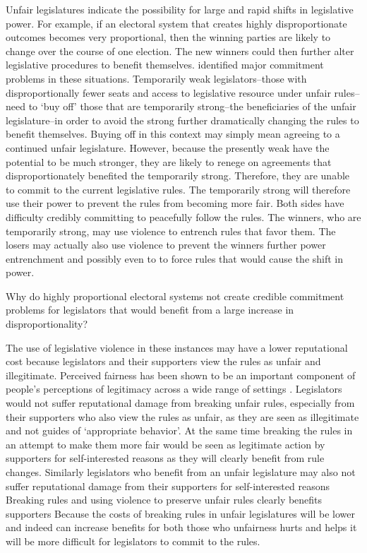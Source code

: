 \documentclass[a4paper]{article}\usepackage[]{graphicx}\usepackage[]{color}
\begin{document}
Unfair legislatures indicate the possibility for large and rapid shifts in legislative power. For example, if an electoral system that creates highly disproportionate outcomes becomes very proportional, then the winning parties are likely to change over the course of one election. The new winners could then further alter legislative procedures to benefit themselves. \cite{Powell2004} identified major commitment problems in these situations. Temporarily weak legislators--those with disproportionally fewer seats and access to legislative resource under unfair rules--need to `buy off' those that are temporarily strong--the beneficiaries of the unfair legislature--in order to avoid the strong further dramatically changing the rules to benefit themselves. Buying off in this context may simply mean agreeing to a continued unfair legislature. However, because the presently weak have the potential to be much stronger, they are likely to renege on agreements that disproportionately benefited the temporarily strong. Therefore, they are unable to commit to the current legislative rules. The temporarily strong will therefore use their power to prevent the rules from becoming more fair. Both sides have difficulty credibly committing to peacefully follow the rules. The winners, who are temporarily strong, may use violence to entrench rules that favor them. The losers may actually also use violence to prevent the winners further power entrenchment and possibly even to to force rules that would cause the shift in power.  

Why do highly proportional electoral systems not create credible commitment problems for legislators that would benefit from a large increase in disproportionality?




The use of legislative violence in these instances may have a lower reputational cost because legislators and their supporters view the rules as unfair and illegitimate. Perceived fairness has been shown to be an important component of people's perceptions of legitimacy across a wide range of settings \citep[see][]{thibaut1975,Tyler2001,Tyler2006}. Legislators would not suffer reputational damage from breaking unfair rules, especially from their supporters who also view the rules as unfair, as they are seen as illegitimate and not guides of `appropriate behavior'. At the same time breaking the rules in an attempt to make them more fair would be seen as legitimate action by supporters for self-interested reasons as they will clearly benefit from rule changes. Similarly legislators who benefit from an unfair legislature may also not suffer reputational damage from their supporters for self-interested reasons Breaking rules and using violence to preserve unfair rules clearly benefits supporters Because the costs of breaking rules in unfair legislatures will be lower and indeed can increase benefits for both those who unfairness hurts and helps it will be more difficult for legislators to commit to the rules.
\end{document}
